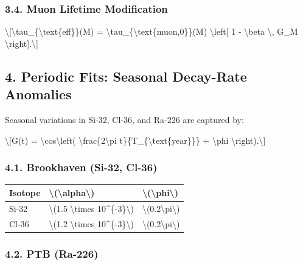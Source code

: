 \documentclass[
  10pt,
]{article}
\begin{document}
\hypertarget{muon-lifetime-modification}{%
\subsubsection{3.4. Muon Lifetime
Modification}\label{muon-lifetime-modification}}

\textbackslash{[}\textbackslash tau\_\{\textbackslash text\{eff\}\}(M) =
\textbackslash tau\_\{\textbackslash text\{muon,0\}\}(M)
\textbackslash left{[} 1 - \textbackslash beta \textbackslash, G\_M
\textbackslash right{]}.\textbackslash{]}

\hypertarget{periodic-fits-seasonal-decay-rate-anomalies}{%
\subsection{4. Periodic Fits: Seasonal Decay-Rate
Anomalies}\label{periodic-fits-seasonal-decay-rate-anomalies}}

Seasonal variations in Si-32, Cl-36, and Ra-226 are captured by:

\textbackslash{[}G(t) = \textbackslash cos\textbackslash left(
\textbackslash frac\{2\textbackslash pi
t\}\{T\_\{\textbackslash text\{year\}\}\} + \textbackslash phi
\textbackslash right).\textbackslash{]}

\hypertarget{brookhaven-si-32-cl-36}{%
\subsubsection{4.1. Brookhaven (Si-32,
Cl-36)}\label{brookhaven-si-32-cl-36}}

\begin{longtable}[]{@{}lll@{}}
\toprule\noalign{}
Isotope & \textbackslash(\textbackslash alpha\textbackslash) &
\textbackslash(\textbackslash phi\textbackslash) \\
\midrule\noalign{}
\endhead
\bottomrule\noalign{}
\endlastfoot
Si-32 & \textbackslash(1.5 \textbackslash times
10\^{}\{-3\}\textbackslash) &
\textbackslash(0.2\textbackslash pi\textbackslash) \\
Cl-36 & \textbackslash(1.2 \textbackslash times
10\^{}\{-3\}\textbackslash) &
\textbackslash(0.2\textbackslash pi\textbackslash) \\
\end{longtable}

\hypertarget{ptb-ra-226}{%
\subsubsection{4.2. PTB (Ra-226)}\label{ptb-ra-226}}
\end{document}
